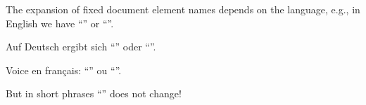 \documentclass{article}
\begin{document}
\raggedright
The expansion of fixed document element names
depends on the language, e.g., in English
we have ``\refname'' or ``\chaptername''.

 Auf Deutsch ergibt sich
``\refname'' oder ``\chaptername''.

\begin{otherlanguage}{french}  Voice en
fran\c cais: ``\refname'' ou ``\chaptername''.

\foreignlanguage{english}{But in short
phrases  ``\refname'' does not change!}
\end{otherlanguage}
\end{document}
